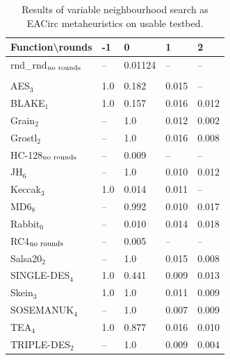 \documentclass[
  print, %
  Table,   %
  nolof,     %
  nolot,     %
  11pt, %
  oneside  %
]{fithesis3}
\newcommand{\fd}{\cellcolor{red!13}}
\newcommand{\fn}{\cellcolor{green!13}}
\begin{document}
\begin{table}[H]
\centering
\begin{tabular}{l|l l l l}
Function\textbackslash{}rounds & -1 & 0 & 1 & 2\\ \hline
rnd\_rnd$_{\textnormal{no rounds}}$ & -- & \fn{}0.01124 & -- & --   \\\\
AES$_{3}$        & \fd{}1.0   & \fd{}0.182 & \fn{}0.015 & \fn{}--   \\
BLAKE$_{1}$      & \fd{}1.0   & \fd{}0.157 & \fn{}0.016 & \fn{}0.012\\
Grain$_{2}$      & \fd{}--    & \fd{}1.0   & \fn{}0.012 & \fn{}0.002\\
Grostl$_{2}$     & \fd{}--    & \fd{}1.0   & \fn{}0.016 & \fn{}0.008\\
HC-128$_{\textnormal{no rounds}}$& -- & \fn{}0.009 & -- & --        \\
JH$_{6}$         & \fd{}--    & \fd{}1.0   & \fn{}0.010 & \fn{}0.012\\
Keccak$_{3}$     & \fd{}1.0   & \fn{}0.014 & \fn{}0.011 & \fn{}--   \\
MD6$_{8}$        & \fd{}--    & \fd{}0.992 & \fn{}0.010 & \fn{}0.017\\
Rabbit$_{0}$     &      --    & \fn{}0.010 & \fn{}0.014 & \fn{}0.018\\
RC4$_{\textnormal{no rounds}}$& -- & \fn{}0.005 & --    & --        \\
Salsa20$_{2}$    & \fd{}--    & \fd{}1.0   & \fn{}0.015 & \fn{}0.008\\
SINGLE-DES$_{4}$ & \fd{}1.0   & \fd{}0.441 & \fn{}0.009 & \fn{}0.013\\
Skein$_{3}$      & \fd{}1.0   & \fd{}1.0   & \fn{}0.011 & \fn{}0.009\\
SOSEMANUK$_{4}$  & \fd{}--    & \fd{}1.0   & \fn{}0.007 & \fn{}0.009\\
TEA$_{4}$        & \fd{}1.0   & \fd{}0.877 & \fn{}0.016 & \fn{}0.010\\
TRIPLE-DES$_{2}$ & \fd{}--    & \fd{}1.0   & \fn{}0.009 & \fn{}0.004
\end{tabular}
\caption{Results of variable neighbourhood search as EACirc metaheuristics on usable testbed.}
\label{table:res-usable-vns}
\end{table}
\end{document}
